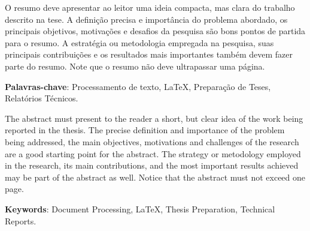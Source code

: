 %
%


O resumo deve apresentar ao leitor uma ideia compacta, mas clara do
trabalho descrito na tese. A definição precisa e importância do
problema abordado, os principais objetivos, motivações e desafios da
pesquisa são bons pontos de partida para o resumo. A estratégia ou
metodologia empregada na pesquisa, suas principais contribuições e os
resultados mais importantes também devem fazer parte do resumo. Note
que o resumo não deve ultrapassar uma página.

\vspace{1.5ex}

{\bf Palavras-chave}: Processamento de texto, \LaTeX,
Preparação de Teses, Relatórios Técnicos.

%
%

The abstract must present to the reader a short, but clear idea of the
work being reported in the thesis. The precise definition and
importance of the problem being addressed, the main objectives,
motivations and challenges of the research are a good starting point
for the abstract. The strategy or metodology employed in the research,
its main contributions, and the most important results achieved may be
part of the abstract as well. Notice that the
abstract must not exceed one page.

\vspace{1.5ex}

{\bf Keywords}: Document Processing, \LaTeX, Thesis Preparation,
Technical Reports.

